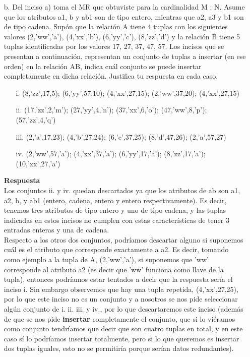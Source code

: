 \documentclass[12pt,a4paper]{article}
\begin{document}
\begin{enumerate}
\begin{enumerate}
				\pagebreak
			\item[b.] Del inciso a) toma el MR que obtuviste para la cardinalidad M : N.
				Asume que los atributos a1, b y ab1 son de tipo entero, mientras que a2, a3 y b1 son de tipo cadena.
				Supón que la relación A tiene 4 tuplas con los siguientes valores
				(2,’ww’,’a’), (4,’xx’,’b’), (6,’yy’,’c’), (8,’zz’,’d’) y la relación B tiene 5
				tuplas identificadas por los valores 17, 27, 37, 47, 57.
				Los incisos que se presentan a continuación, representan un conjunto de tuplas a
				insertar (en ese orden) en la relación AB, indica cuál conjunto se puede insertar
				completamente en dicha relación. Justifica tu respuesta en cada caso.

				\begin{enumerate}
					\item[i.] (8,’zz’,17,5); (6,’yy’,57,10); (4,’xx’,27,15); (2,’ww’,37,20); (4,’xx’,27,15)\\
					\item[ii.] (17,’zz’,2,’m’); (27,’yy’,4,’n’); (37,’xx’,6,’o’); (47,’ww’,8,’p’); (57,’zz’,4,’q’)\\
					\item[iii.] (2,’a’,17,23); (4,’b’,27,24); (6,’c’,37,25); (8,’d’,47,26); (2,’a’,57,27)\\
					\item[iv.] (2,’ww’,57,’a’); (4,’xx’,37,’a’); (6,’yy’,17,’a’); (8,’zz’,17,’a’); (10,’xx’,27,’a’)\\
				\end{enumerate}
				
				\textbf{Respuesta}\\
				Los conjuntos ii. y iv. quedan descartados ya que los atributos de ab son a1, a2, b, y ab1 (entero, cadena, entero y entero respectivamente). Es decir, tenemos tres atributos de tipo entero y uno de tipo cadena, y las tuplas indicadas en estos incisos no cumplen con estas características de tener 3 entradas enteras y una de cadena.\\

				Respecto a los otros dos conjuntos, podríamos descartar alguno si suponemos cuál es el atributo que corresponde exactamente a a2.
				Es decir, tomando como ejemplo a la tupla de A, (2,'ww','a'), si suponemos que 'ww' corresponde al atributo a2 (es decir que 'ww' funciona como llave de la tupla), entonces podríamos estar tentados a decir que la respuesta sería el inciso i. Sin embargo observemos que hay una tupla repetida, (4,'xx',27,25), por lo que este inciso no es un conjunto y a nosotros se nos pide seleccionar algún conjunto de i. ii. iii. y iv., por lo que descartaremos este inciso (además de que se nos pide \textbf{insertar} completamente el conjunto, que si lo viéramos como conjunto tendríamos que decir que son cuatro tuplas en total, y en este caso sí lo podríamos insertar totalmente, pero si lo que queremos es insertar dos tuplas iguales, esto no se permitiría porque serían datos redundantes).\\


\end{enumerate}
\end{enumerate}
\end{document}
